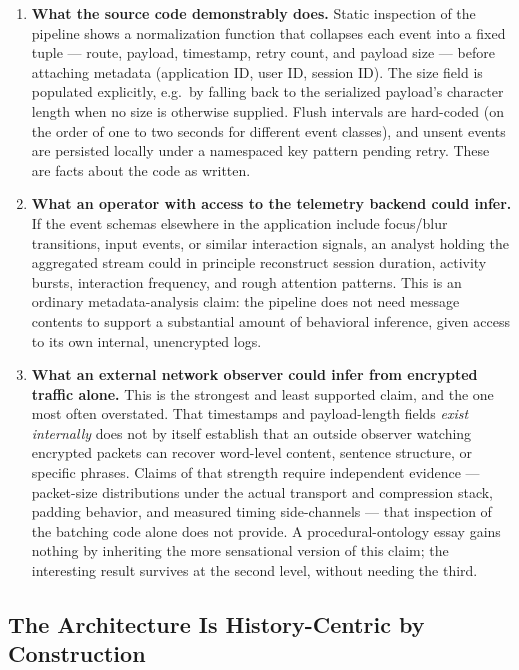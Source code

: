 \documentclass[12pt,a4paper]{article}
\theoremstyle{plain}
\theoremstyle{definition}
\theoremstyle{remark}
\begin{document}
\begin{enumerate}
  \item \textbf{What the source code demonstrably does.} Static inspection of the pipeline shows a normalization function that collapses each event into a fixed tuple — route, payload, timestamp, retry count, and payload size — before attaching metadata (application ID, user ID, session ID). The size field is populated explicitly, e.g.\ by falling back to the serialized payload's character length when no size is otherwise supplied. Flush intervals are hard-coded (on the order of one to two seconds for different event classes), and unsent events are persisted locally under a namespaced key pattern pending retry. These are facts about the code as written.
  \item \textbf{What an operator with access to the telemetry backend could infer.} If the event schemas elsewhere in the application include focus/blur transitions, input events, or similar interaction signals, an analyst holding the aggregated stream could in principle reconstruct session duration, activity bursts, interaction frequency, and rough attention patterns. This is an ordinary metadata-analysis claim: the pipeline does not need message contents to support a substantial amount of behavioral inference, given access to its own internal, unencrypted logs.
  \item \textbf{What an external network observer could infer from encrypted traffic alone.} This is the strongest and least supported claim, and the one most often overstated. That timestamps and payload-length fields \emph{exist internally} does not by itself establish that an outside observer watching encrypted packets can recover word-level content, sentence structure, or specific phrases. Claims of that strength require independent evidence — packet-size distributions under the actual transport and compression stack, padding behavior, and measured timing side-channels — that inspection of the batching code alone does not provide. A procedural-ontology essay gains nothing by inheriting the more sensational version of this claim; the interesting result survives at the second level, without needing the third.
\end{enumerate}

\subsection{The Architecture Is History-Centric by Construction}
\label{subsec:telemetry-history-centric}
\end{document}
